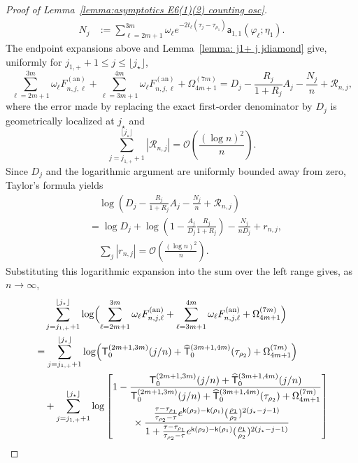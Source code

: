 \documentclass[a4paper]{article}
\numberwithin{equation}{section}
\begin{document}
\begin{proof}[Proof of Lemma~\ref{lemma:asymptotics E6(1)(2) counting osc}]
\begin{align*}
N_j&:=\sum_{\ell=2m+1}^{3m}\omega_\ell
e^{-2t_\ell(\tau_j-\tau_{\rho_1})}
\mathsf a_{1,1}(\varphi_\ell;\eta_1).
\end{align*}
The endpoint expansions above and
Lemma~\ref{lemma: j1+ j jdiamond} give, uniformly for
$j_{1,+}+1\le j\le\lfloor j_\star\rfloor$,
\[
\sum_{\ell=2m+1}^{3m}\omega_\ell F_{n,j,\ell}^{(\mathrm{an})}
+\sum_{\ell=3m+1}^{4m}\omega_\ell F_{n,j,\ell}^{(\mathrm{an})}
+\Omega_{4m+1}^{(7m)}
=D_j-\frac{R_j}{1+R_j}A_j-\frac{N_j}{n}+\mathcal R_{n,j},
\]
where the error made by replacing the exact first-order denominator by $D_j$
is geometrically localized at $j_\star$ and
\[
\sum_{j=j_{1,+}+1}^{\lfloor j_\star\rfloor}|\mathcal R_{n,j}|
=\mathcal O\!\left(\frac{(\log n)^2}{n}\right).
\]
Since $D_j$ and the logarithmic argument are uniformly bounded away from
zero, Taylor's formula yields
\begin{align*}
&\quad \log\!\left(D_j-\frac{R_j}{1+R_j}A_j-\frac{N_j}{n}
+\mathcal R_{n,j}\right)
\\
&=\log D_j+\log\!\left(1-\frac{A_j}{D_j}\frac{R_j}{1+R_j}\right)
-\frac{N_j}{nD_j}+r_{n,j},
\\
&\quad\sum_j|r_{n,j}|=\mathcal O\!\left(\frac{(\log n)^2}{n}\right).
\end{align*}
Substituting this logarithmic expansion into the sum over the left range
gives, as $n\to\infty$,
\begin{align*}
&\quad\sum_{j=j_{1,+}+1}^{\lfloor j_{\star}\rfloor}    
\log
\Bigl(\sum_{\ell=2m+1}^{3m}\omega_{\ell}F_{n,j,\ell}^{(\mathrm{an})}
+\sum_{\ell=3m+1}^{4m}\omega_{\ell}F_{n,j,\ell}^{(\mathrm{an})}
+\Omega_{4m+1}^{(7m)}
\Bigr)
\\
&=
\sum_{j=j_{1,+}+1}^{\lfloor j_{\star}\rfloor}
\log\Bigl(\mathsf{T}_{0}^{(2m+1,3m)}(j/n)
+\widehat{\mathsf{T}}_0^{(3m+1,4m)}(\tau_{\rho_2})
+\Omega_{4m+1}^{(7m)}\Bigr)
\\
&\quad
+\sum_{j=j_{1,+}+1}^{\lfloor j_{\star}\rfloor}
\log\left[\begin{aligned}&
1-\frac{\mathsf{T}_{0}^{(2m+1,3m)}(j/n)+\widehat{\mathsf{T}}_0^{(3m+1,4m)}(j/n)}{\mathsf{T}_{0}^{(2m+1,3m)}(j/n)
+\widehat{\mathsf{T}}_0^{(3m+1,4m)}(\tau_{\rho_2})
+\Omega_{4m+1}^{(7m)}}
\\
&\qquad\times\frac{\frac{\tau-\tau_{\rho_1}}{\tau_{\rho_2}-\tau}e^{\mathsf{k}(\rho_2)-\mathsf{k}(\rho_1)}(\tfrac{\rho_1}{\rho_2})^{2(j_{\star}-j-1)}}{1+\frac{\tau-\tau_{\rho_1}}{\tau_{\rho_2}-\tau}e^{\mathsf{k}(\rho_2)-\mathsf{k}(\rho_1)}(\tfrac{\rho_1}{\rho_2})^{2(j_{\star}-j-1)}}
\end{aligned}\right]

\end{align*}
\end{proof}
\end{document}

